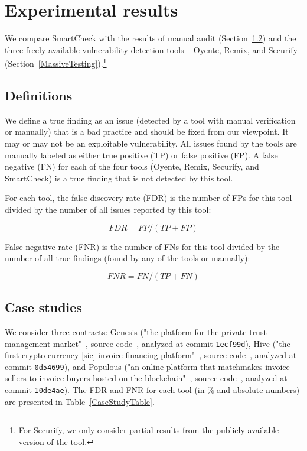 \section{Experimental results} \label{SectionResults}

We compare SmartCheck with the results of manual audit (Section~\ref{ManualAudit}) and the three freely available vulnerability detection tools -- Oyente, Remix, and Securify (Section~\ref{MassiveTesting}).\footnote{For Securify, we only consider partial results from the publicly available version of the tool.}


\subsection{Definitions}

We define a true finding as an issue (detected by a tool with manual verification or manually) that is a bad practice and should be fixed from our viewpoint.
It may or may not be an exploitable vulnerability.
All issues found by the tools are manually labeled as either true positive (TP) or false positive (FP).
A false negative (FN) for each of the four tools (Oyente, Remix, Securify, and SmartCheck) is a true finding that is not detected by this tool.

For each tool, the false discovery rate (FDR) is the number of FPs for this tool divided by the number of all issues reported by this tool:

\[FDR = FP / (TP + FP)\]

False negative rate (FNR) is the number of FNs for this tool divided by the number of all true findings (found by any of the tools or manually):

\[FNR = FN / (TP + FN)\]


\subsection{Case studies} \label{ManualAudit}

We consider three contracts: Genesis ("the platform for the private trust management market"~\cite{Genesis}, source code~\cite{GenesisGithub}, analyzed at commit \texttt{1ecf99d}), Hive ("the first crypto currency [sic] invoice financing platform"~\cite{Hive}, source code~\cite{HiveGithub}, analyzed at commit \texttt{0d54699}), and Populous ("an online platform that matchmakes invoice sellers to invoice buyers hosted on the blockchain"~\cite{Populous}, source code~\cite{PopulousGithub}, analyzed at commit \texttt{10de4ae}).
The FDR and FNR for each tool (in \% and absolute numbers) are presented in Table~\ref{CaseStudyTable}.

